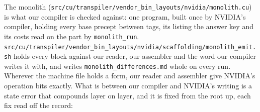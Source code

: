\begin{enumerate}
The monolith (\texttt{src/\allowbreak{}cu/\allowbreak{}transpiler/\allowbreak{}vendor\_\allowbreak{}bin\_\allowbreak{}layouts/\allowbreak{}nvidia/\allowbreak{}monolith.\allowbreak{}cu}) is what our compiler is checked against: one program, built once by NVIDIA's compiler, holding every base precept between tags, its listing the answer key and its costs read on the part by \texttt{monolith\_\allowbreak{}run}. \texttt{src/\allowbreak{}cu/\allowbreak{}transpiler/\allowbreak{}vendor\_\allowbreak{}bin\_\allowbreak{}layouts/\allowbreak{}nvidia/\allowbreak{}scaffolding/\allowbreak{}monolith\_\allowbreak{}emit.\allowbreak{}sh} holds every block against our reader, our assembler and the word our compiler writes it with, and writes \texttt{monolith\_\allowbreak{}differences.\allowbreak{}md} whole on every run. Wherever the machine file holds a form, our reader and assembler give NVIDIA's operation bits exactly. What is between our compiler and NVIDIA's writing is a state error that compounds layer on layer, and it is fixed from the root up, each fix read off the record:


\end{enumerate}
